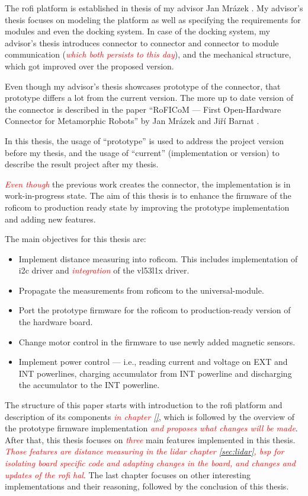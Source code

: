\documentclass[
  digital,     %
  oneside,     %
  nosansbold,  %
  nocolorbold, %
  lof,         %
  lot,         %
]{fithesis4}
\newcommand{\TODO}[1]{\textcolor{red}{\textit{#1}}}
\begin{document}
The \acrshort{rofi} platform is established in thesis of my advisor Jan Mrázek \cite{Mrazek2019thesis}. My advisor's thesis focuses on modeling the platform as well as specifying the requirements for modules and even the docking system. In case of the docking system, my advisor's thesis introduces connector to connector and connector to module communication (\TODO{which both persists to this day}), and the mechanical structure, which got improved over the proposed version.

Even though my advisor's thesis showcases prototype of the connector, that prototype differs a lot from the current version. The more up to date version of the connector is described in the paper ``RoFICoM --- First Open-Hardware Connector for Metamorphic Robots'' by Jan Mrázek and Jiří Barnat \cite{MrazekBarnat2019Roficom}.

In this thesis, the usage of ``prototype'' is used to address the project version before my thesis, and the usage of ``current'' (implementation or version) to describe the result project after my thesis.

\TODO{Even though} the previous work creates the connector, the implementation is in work-in-progress state. The aim of this thesis is to enhance the firmware of the \acrshort{roficom} to production ready state by improving the prototype implementation and adding new features.

The main objectives for this thesis are:
\begin{itemize}
    \item Implement distance measuring into \acrshort{roficom}. This includes implementation of \acrshort{i2c} driver and \TODO{integration} of the \gls{vl53l1x} driver.
    \item Propagate the measurements from \acrshort{roficom} to the \gls{universal-module}. 
    \item Port the prototype firmware for the \acrshort{roficom} to production-ready version of the hardware board.
    \item Change motor control in the firmware to use newly added magnetic sensors.
    \item Implement power control --- i.e., reading current and voltage on EXT and INT powerlines, charging accumulator from INT powerline and discharging the accumulator to the INT powerline.
\end{itemize}

The structure of this paper starts with introduction to the \acrshort{rofi} platform and description of its components \TODO{in chapter \ref{}}, which is followed by the overview of the prototype firmware implementation \TODO{and proposes what changes will be made}. After that, this thesis focuses on \TODO{three} main features implemented in this thesis. \TODO{Those features are distance measuring in the \acrshort{lidar} chapter \ref{sec:lidar}, \acrlong{bsp} for isolating board specific code and adapting changes in the board, and changes and updates of the \acrshort{rofi} \acrlong{hal}}. The last chapter focuses on other interesting implementations and their reasoning, followed by the conclusion of this thesis.
\end{document}
